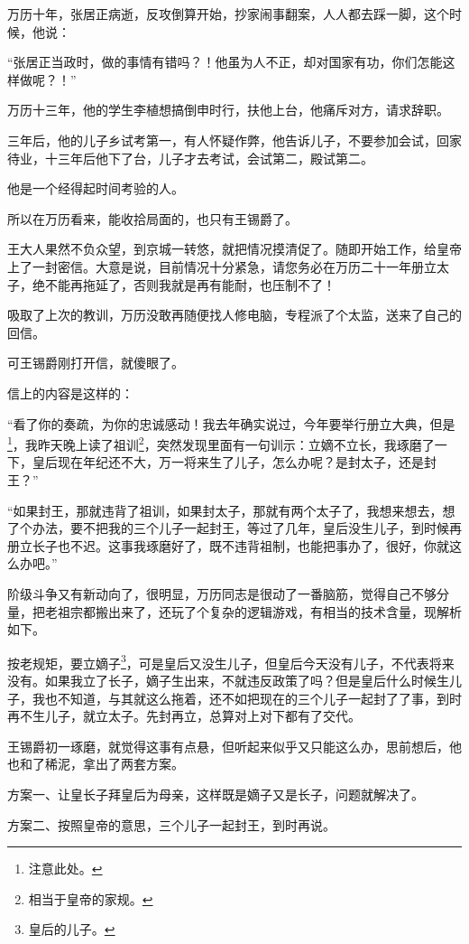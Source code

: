 \begin{multicols}{\theparacolNo}
		万历十年，张居正病逝，反攻倒算开始，抄家闹事翻案，人人都去踩一脚，这个时候，他说：

		“张居正当政时，做的事情有错吗？！他虽为人不正，却对国家有功，你们怎能这样做呢？！”

		万历十三年，他的学生李植想搞倒申时行，扶他上台，他痛斥对方，请求辞职。

		三年后，他的儿子乡试考第一，有人怀疑作弊，他告诉儿子，不要参加会试，回家待业，十三年后他下了台，儿子才去考试，会试第二，殿试第二。

		他是一个经得起时间考验的人。

		所以在万历看来，能收拾局面的，也只有王锡爵了。

		王大人果然不负众望，到京城一转悠，就把情况摸清促了。随即开始工作，给皇帝上了一封密信。大意是说，目前情况十分紧急，请您务必在万历二十一年册立太子，绝不能再拖延了，否则我就是再有能耐，也压制不了！

		吸取了上次的教训，万历没敢再随便找人修电脑，专程派了个太监，送来了自己的回信。

		可王锡爵刚打开信，就傻眼了。

		信上的内容是这样的：

		“看了你的奏疏，为你的忠诚感动！我去年确实说过，今年要举行册立大典，但是\footnote{注意此处。}，我昨天晚上读了祖训\footnote{相当于皇帝的家规。}，突然发现里面有一句训示：立嫡不立长，我琢磨了一下，皇后现在年纪还不大，万一将来生了儿子，怎么办呢？是封太子，还是封王？”

		“如果封王，那就违背了祖训，如果封太子，那就有两个太子了，我想来想去，想了个办法，要不把我的三个儿子一起封王，等过了几年，皇后没生儿子，到时候再册立长子也不迟。这事我琢磨好了，既不违背祖制，也能把事办了，很好，你就这么办吧。”

		阶级斗争又有新动向了，很明显，万历同志是很动了一番脑筋，觉得自己不够分量，把老祖宗都搬出来了，还玩了个复杂的逻辑游戏，有相当的技术含量，现解析如下。

		按老规矩，要立嫡子\footnote{皇后的儿子。}，可是皇后又没生儿子，但皇后今天没有儿子，不代表将来没有。如果我立了长子，嫡子生出来，不就违反政策了吗？但是皇后什么时候生儿子，我也不知道，与其就这么拖着，还不如把现在的三个儿子一起封了了事，到时再不生儿子，就立太子。先封再立，总算对上对下都有了交代。

		王锡爵初一琢磨，就觉得这事有点悬，但听起来似乎又只能这么办，思前想后，他也和了稀泥，拿出了两套方案。

		方案一、让皇长子拜皇后为母亲，这样既是嫡子又是长子，问题就解决了。

		方案二、按照皇帝的意思，三个儿子一起封王，到时再说。


\end{multicols}

